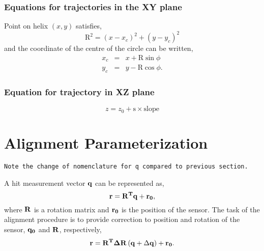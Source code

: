 \documentclass{article}
\def\R{\ensuremath{\mathrm{R}}}
\def\slope{\ensuremath{\mathrm{slope}}}
\def\vec#1{\ensuremath{\mathrm{\bf #1}}}
\begin{document}
\subsubsection*{Equations for trajectories in the XY plane}
Point on helix $(x,y)$ satisfies,
\begin{equation}
\R^2 =  \left(x-x_c\right)^2 +  \left(y-y_c\right)^2 \label{eq:circle}
\end{equation}
and the coordinate of the centre of the circle can be written,
\begin{eqnarray}
x_c &=& x + \R\sin\phi \label{eq:xc}\\
y_c &=& y - \R\cos\phi \label{eq:yc}.
\end{eqnarray}

\subsubsection*{Equation for trajectory in XZ plane}
\begin{equation}
z = z_0 + \mathrm{s}\times\slope \label{eq:z}
\end{equation}
















\section{Alignment Parameterization}
\label{sec:param}
\begin{verbatim}
Note the change of nomenclature for q compared to previous section.
\end{verbatim}
A hit measurement vector \vec{q} can be represented as,
\begin{equation}
\vec{r} = \vec{R^T}\vec{q} + \vec{r_0},
\end{equation}
where \vec{R} is a rotation matrix and \vec{r_0} is the position of the sensor. The task of the 
alignment procedure is to provide correction to position and rotation of the sensor, \vec{q_0} and \vec{R}, respectively,
\begin{equation}
\vec{r} = \vec{R^T}\vec{\Delta R}\left( \vec{q} + \Delta \vec{q} \right) + \vec{r_0}.
\end{equation}
\end{document}

